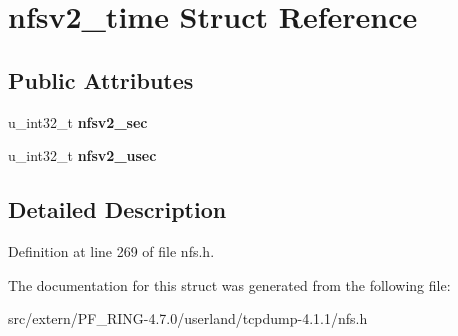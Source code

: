 \hypertarget{structnfsv2__time}{
\section{nfsv2\_\-time Struct Reference}
\label{structnfsv2__time}
}
\subsection*{Public Attributes}
\begin{DoxyCompactItemize}
\item 
\hypertarget{structnfsv2__time_a08ea5d91386035070f48303b5b08d8ae}{
u\_\-int32\_\-t {\bfseries nfsv2\_\-sec}}
\label{structnfsv2__time_a08ea5d91386035070f48303b5b08d8ae}

\item 
\hypertarget{structnfsv2__time_a4e53746a9225e93a19c26bba0fc5e93d}{
u\_\-int32\_\-t {\bfseries nfsv2\_\-usec}}
\label{structnfsv2__time_a4e53746a9225e93a19c26bba0fc5e93d}

\end{DoxyCompactItemize}


\subsection{Detailed Description}


Definition at line 269 of file nfs.h.



The documentation for this struct was generated from the following file:\begin{DoxyCompactItemize}
\item 
src/extern/PF\_\-RING-\/4.7.0/userland/tcpdump-\/4.1.1/nfs.h\end{DoxyCompactItemize}

